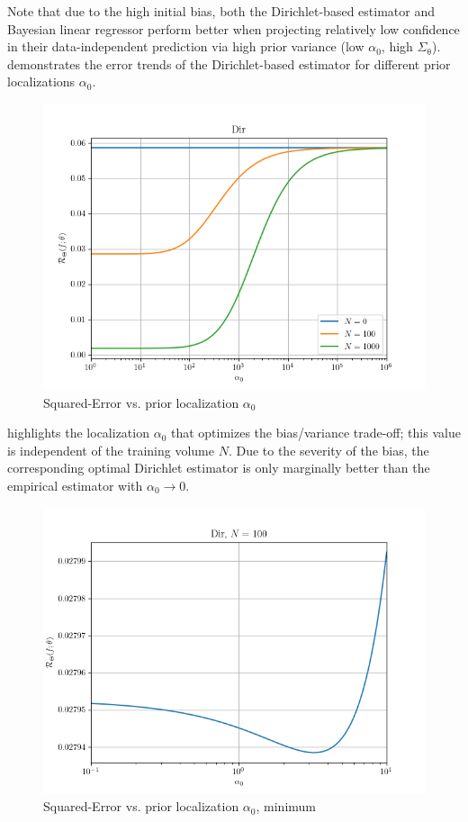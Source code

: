 \documentclass[12pt]{report}
\begin{document}
Note that due to the high initial bias, both the Dirichlet-based estimator and Bayesian linear regressor perform better when projecting relatively low confidence in their data-independent prediction via high prior variance (low $\alpha_0$, high $\Sigma_{\uptheta}$).  demonstrates the error trends of the Dirichlet-based estimator for different prior localizations $\alpha_0$.
\begin{figure}
\centering
\includegraphics[width=0.8\linewidth]{SSP_2021/Risk_cond_SE_a0_biased_hard.png}
\caption{Squared-Error vs. prior localization $\alpha_0$}
\label{fig:SSP_2021/Risk_cond_SE_a0_biased_hard}
\end{figure} 
 highlights the localization $\alpha_0$ that optimizes the bias/variance trade-off; this value is independent of the training volume $N$. Due to the severity of the bias, the corresponding optimal Dirichlet estimator is only marginally better than the empirical estimator with $\alpha_0 \to 0$.
\begin{figure}
\centering
\includegraphics[width=0.8\linewidth]{SSP_2021/Risk_cond_SE_a0_biased_hard_zoom.png}
\caption{Squared-Error vs. prior localization $\alpha_0$, minimum}
\label{fig:SSP_2021/Risk_cond_SE_a0_biased_hard_zoom}
\end{figure}
\end{document}
